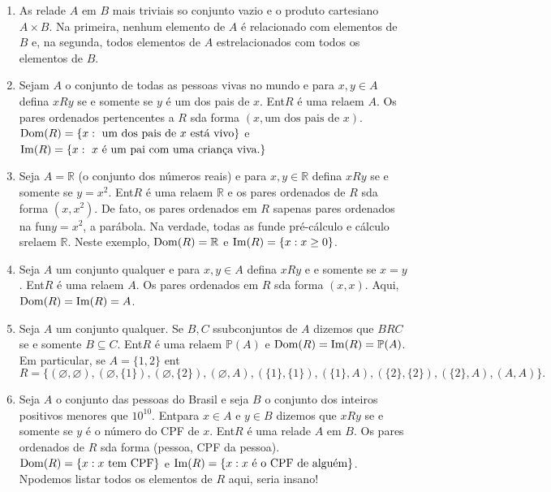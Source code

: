 \begin{enumerate}[{\bf 1.}]

\item As rela\coes de $A$ em $B$ mais triviais s\ao o conjunto vazio e o produto cartesiano $A\times B$. Na primeira, nenhum elemento de $A$ \'e relacionado com elementos de $B$ e, na segunda, todos elementos de $A$ est\ao relacionados com todos os elementos de $B$. 

\item\label{relex1} Sejam $A$ o conjunto de todas as pessoas vivas no mundo e para $x,y\in A$ defina $xRy$ se e somente se $y$ \'e um dos pais de $x$. Ent\ao $R$ \'e uma rela\cao em $A$. Os pares ordenados pertencentes a $R$ s\ao da forma $(x,\textrm{um dos pais de $x$})$. $\operatorname{Dom}(R)=\{x: \textrm{ um dos pais de $x$ est\'a vivo}\}$ e $\Ima(R)=\{x: \textrm{ $x$ \'e um pai com uma crian\cc a viva.}\}$  

\item\label{relex2} Seja $A=\mathbb{R}$ (o conjunto dos n\'umeros reais) e para $x,y\in \mathbb{R}$ defina $xRy$ se e somente se $y=x^2$. Ent\ao $R$ \'e uma rela\cao em $\mathbb{R}$ e os pares ordenados de $R$ s\ao da forma $(x,x^2)$. De fato, os pares ordenados em $R$ s\ao apenas pares ordenados na fun\cao $y=x^2$, a par\'abola. Na verdade, todas as fun\coes de pr\'e-c\'alculo e c\'alculo s\ao rela\coes em $\mathbb{R}$. Neste exemplo, $\operatorname{Dom}(R)=\mathbb{R}$ e $\operatorname{Im}(R)=\{x: x\geq 0\}$.

\item\label{relex3} Seja $A$ um conjunto qualquer e para $x,y\in A$ defina $xRy$ e e somente se $x=y$. Ent\ao $R$ \'e uma rela\cao em $A$. Os pares ordenados em $R$ s\ao da forma $(x,x)$. Aqui, $\operatorname{Dom}(R)=\operatorname{Im}(R)=A$.

\item\label{relex4} Seja $A$ um conjunto qualquer. Se $B,C$ s\ao subconjuntos de $A$ dizemos que $BRC$ se e somente $B\subseteq C$. Ent\ao $R$ \'e uma rela\cao em $\mathbb{P}(A)$ e $\operatorname{Dom}(R)=\operatorname{Im}(R)=\mathbb{P}(A)$. Em particular, se $A=\{1,2\}$ ent\ao
\[
R=\{(\varnothing,\varnothing),(\varnothing,\{1\}),(\varnothing,\{2\}),(\varnothing,A),(\{1\},\{1\}),(\{1\},A),(\{2\},\{2\}),(\{2\},A),(A,A)\}.
\]

\item\label{relex5} Seja $A$ o conjunto das pessoas do Brasil e seja $B$ o conjunto dos inteiros positivos menores que $10^{10}$. Ent\ao para $x\in A$ e $y\in B$ dizemos que $xRy$ se e somente se $y$ \'e o n\'umero do CPF de $x$. Ent\ao $R$ \'e uma rela\cao de $A$ em $B$. Os pares ordenados de $R$ s\ao da forma (pessoa, CPF da pessoa).  $\operatorname{Dom}(R)=\{x: x \textrm{ tem CPF}\}$ e $\operatorname{Im}(R)=\{x: x \textrm{ \'e o CPF de algu\'em}\}$. N\ao podemos listar todos os elementos de $R$ aqui, seria insano!


\end{enumerate}
